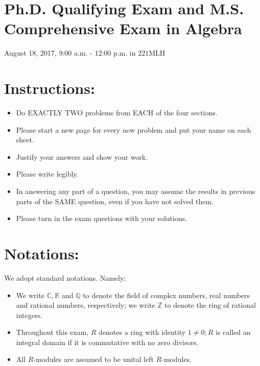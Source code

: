 \documentclass[10pt]{article}
\begin{document}
\section*{Ph.D. Qualifying Exam and M.S. Comprehensive Exam in Algebra }

August 18, 2017, 9:00 a.m. - 12:00 p.m. in $221 \mathrm{MLH}$

\section*{Instructions: }
\begin{itemize}
  \item Do EXACTLY TWO problems from EACH of the four sections.

  \item Please start a new page for every new problem and put your name on each sheet.

  \item Justify your answers and show your work.

  \item Please write legibly.

  \item In answering any part of a question, you may assume the results in previous parts of the SAME question, even if you have not solved them.

  \item Please turn in the exam questions with your solutions.

\end{itemize}
\section{Notations:}
We adopt standard notations. Namely:

\begin{itemize}
  \item We write $\mathbb{C}, \mathbb{R}$ and $\mathbb{Q}$ to denote the field of complex numbers, real numbers and rational numbers, respectively; we write $\mathbb{Z}$ to denote the ring of rational integers.

  \item Throughout this exam, $R$ denotes a ring with identity $1 \neq 0 ; R$ is called an integral domain if it is commutative with no zero divisors.

  \item All $R$-modules are assumed to be unital left $R$-modules.

\end{itemize}
\end{document}
